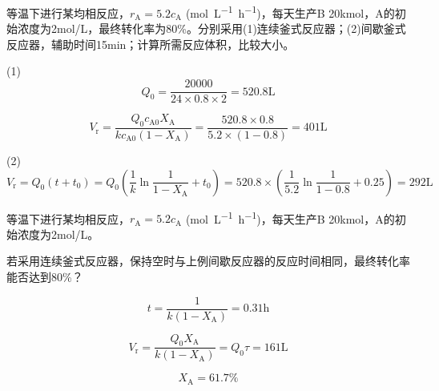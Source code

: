 \begin{frame}[t]{}
    \begin{example}
        等温下进行某均相反应，$r_\mathrm{A}=5.2c_\mathrm{A}$ (\si{mol.L^{-1}.h^{-1}})，每天生产B 20kmol，A的初始浓度为2mol/L，最终转化率为80\%。分别采用(1)连续釜式反应器；(2)间歇釜式反应器，辅助时间15min；计算所需反应体积，比较大小。
    \end{example}\pause

    (1) 
    \[
        Q_0 = \frac{20000}{24\times 0.8 \times 2} = 520.8 \mathrm{L}
    \]

    \[
        V_{\mathrm{r}}=\frac{Q_{0} c_{\mathrm{A} 0} X_{\mathrm{A}}}{kc_{\mathrm{A0}}(1-X_{\mathrm{A}})}=  \frac{520.8 \times 0.8}{5.2 \times (1-0.8)}=401\mathrm{L}
    \]

    (2)
    \[
        V_{\mathrm{r}}=Q_{0}(t+t_0)=Q_{0}(\frac{1}{k}\ln \frac{1}{1-X_{\mathrm{A}}}+t_0)=520.8\times \left(\frac{1}{5.2}\ln \frac{1}{1-0.8}+0.25\right)=292\mathrm{L}
    \]

\end{frame}


\begin{frame}[t]{}
    \begin{example}
        等温下进行某均相反应，$r_\mathrm{A}=5.2c_\mathrm{A}$ (\si{mol.L^{-1}.h^{-1}})，每天生产B 20kmol，A的初始浓度为2mol/L。
        
        若采用连续釜式反应器，保持空时与上例间歇反应器的反应时间相同，最终转化率能否达到80\%？
    \end{example}\pause

    
    \[
        t =\frac{1}{k(1-X_{\mathrm{A}})} =0.31 \mathrm{h}
    \]

    \[
        V_{\mathrm{r}} =\frac{Q_{0} X_{\mathrm{A}}}{k(1-X_{\mathrm{A}})}=Q_{0}\tau= 161 \mathrm{L}
    \]

    \[
        X_{\mathrm{A}} =61.7\%
    \]
\end{frame}
